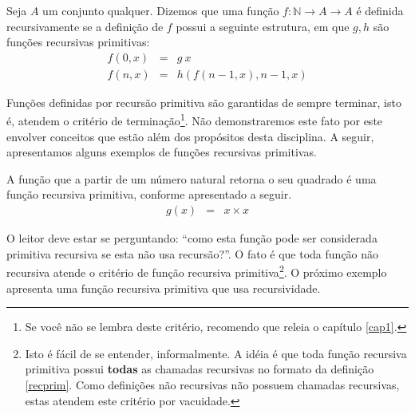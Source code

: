 \begin{Definition}\label{recprim}
Seja $A$ um conjunto qualquer. Dizemos que uma função $f : \mathbb{N}
\to A \to A$ é definida  recursivamente se a definição de
$f$ possui a seguinte estrutura, em que $g,h$ são funções
recursivas primitivas:
\[
\begin{array}{lcl}
f(0,x) & = & g\:x\\
f(n,x) & = & h(f (n - 1, x), n - 1, x)
\end{array}
\]
\end{Definition}
Funções definidas por recursão primitiva são garantidas de sempre
terminar, isto é, atendem o critério de terminação\footnote{Se você
  não se lembra deste critério, recomendo que releia o capítulo \ref{cap1}.}.
Não demonstraremos este fato por este envolver conceitos que estão
além dos propósitos desta disciplina. A seguir, apresentamos alguns
exemplos de funções recursivas primitivas.
\begin{Example}
A função que a partir de um número natural retorna o seu quadrado é
uma função recursiva primitiva, conforme apresentado a seguir.
\[
\begin{array}{lcl}
g(x) & = & x \times x
\end{array}
\]
\end{Example}
O leitor deve estar se perguntando: ``como esta função pode ser
considerada primitiva recursiva se esta não usa recursão?''. O fato é
que toda função não recursiva atende o critério de função recursiva
primitiva\footnote{Isto é fácil de se entender, informalmente. A idéia
é que toda função recursiva primitiva possui \textbf{todas} as
chamadas recursivas no formato da definição \ref{recprim}. Como
definições não recursivas não possuem chamadas recursivas, estas
atendem este critério por vacuidade.}. O próximo exemplo apresenta uma função recursiva primitiva
que usa recursividade.
